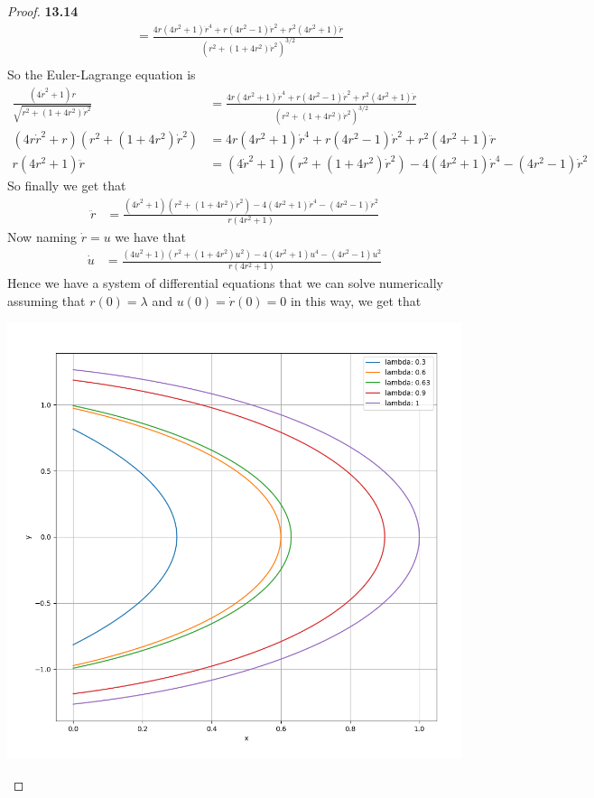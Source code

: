 \documentclass[11pt]{article}
\theoremstyle{definition}
\begin{document}
\begin{proof}{\textbf{13.14}}
\begin{align*}
        &= \frac{4r(4r^2 + 1)\dot r^4 + r(4r^2 - 1)\dot r^2 + r^2(4r^2 + 1)\ddot r}
        {(r^2 + (1 + 4r^2)\dot r^2)^{3/2}}\\
    \end{align*}
    So the Euler-Lagrange equation is
    \begin{align*}
        \frac{(4\dot r^2+1)r}{\sqrt{r^2 + (1 + 4r^2)\dot{r}^2}}
        &= \frac{4r(4r^2 + 1)\dot r^4 + r(4r^2 - 1)\dot r^2 + r^2(4r^2 + 1)\ddot r}
        {(r^2 + (1 + 4r^2)\dot r^2)^{3/2}}\\
        (4r\dot r^2+r)(r^2 + (1 + 4r^2)\dot r^2)
        &= 4r(4r^2 + 1)\dot r^4 + r(4r^2 - 1)\dot r^2 + r^2(4r^2 + 1)\ddot r\\
        r(4r^2 + 1)\ddot r  &= (4\dot r^2 + 1)(r^2 + (1 + 4r^2)\dot r^2)
        - 4(4r^2 + 1)\dot r^4 - (4r^2 - 1)\dot r^2
    \end{align*}
    So finally we get that
    \begin{align*}
        \ddot r  &= \frac{(4\dot r^2 + 1)(r^2 + (1 + 4r^2)\dot r^2)
        - 4(4r^2 + 1)\dot r^4 - (4r^2 - 1)\dot r^2}{r(4r^2 + 1)}
    \end{align*}
    Now naming $\dot r = u$ we have that
    \begin{align*}
        \dot u  &= \frac{(4u^2 + 1)(r^2 + (1 + 4r^2)u^2)
        - 4(4r^2 + 1)u^4 - (4r^2 - 1)u^2}{r(4r^2 + 1)}
    \end{align*}
    Hence we have a system of differential equations that we can solve
    numerically assuming that $r(0) = \lambda$ and $u(0) = \dot{r}(0) = 0$
    in this way, we get that
    \begin{center}
        \includegraphics[scale=0.5]{ch13-14_2.png}

\end{center}
\end{proof}
\end{document}

